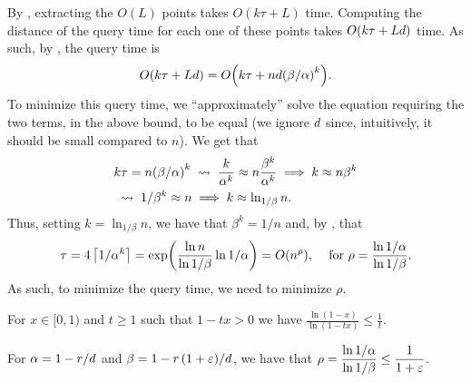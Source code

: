 By , extracting the $O(L)$ points takes 
$O( k \tau + L)$ time. Computing the distance of the query time for
each one of these points takes $O(  k \tau + L d)$ time. 
As such, by , the query time is 
\begin{align*}
    O\pth{ k \tau + L \hdim}%
    =%
    O\pth{ k \tau + n \hdim \pth{\beta/\alpha}^k }.
\end{align*}
To minimize this query time, we ``approximately'' solve the equation
requiring the two terms, in the above bound, to be equal (we ignore
$d$ since, intuitively, it should be small compared to $n$).  We
get that
\begin{align*}
    & k \tau = n\pth{\beta/\alpha}^k%
    \;\leadsto\;%
    \frac{k}{\alpha^k} \approx n{\frac{\beta^k}{\alpha^k}} \implies k
    \approx n\beta^k
    \\
    & %
    \;\leadsto\;%
    1/\beta^k \approx n
    \implies k \approx \ln_{1/\beta} n.
\end{align*}
Thus, setting $k = \ln_{1/\beta} n$, we have that $\beta^k = 1/n$ and,
by , that
\begin{equation}
    \tau = 4 \ceil{1/\alpha^k} = \exp\pth{ \frac{\ln n}{\ln 1/\beta}
       \ln 1/\alpha } = O \pth{ n^{ \rho }},%
    \;\;\; \text{ for }%
    \rho = \frac{\ln 1/\alpha}{ \ln 1/\beta}.
    \eqlab{rho:ratio}
\end{equation}
As such, to minimize the query time, we need to minimize $\rho$.


\begin{lemma}
    \begin{compactenumA}
        \item For $x\in[0,1)$ and $t\geq 1$ such that $1 - tx > 0$ we
        have $\displaystyle
        \frac{\ln(1-x)}{\ln(1-tx)}\leq\frac{1}{t}$.


        \item For $\alpha = 1-{r}/{d}$ and $\beta = 1 -
        {r\,(1+{\varepsilon})}/{d}$, we have that $\displaystyle \rho = \frac{\ln
           1/\alpha}{ \ln 1/\beta} \leq \frac{1}{1+{\varepsilon}}$.
    \end{compactenumA}
\end{lemma}

